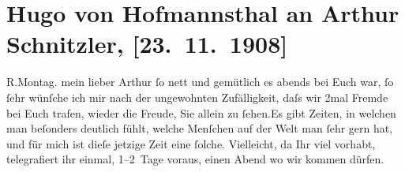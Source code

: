 

         
         \renewcommand{\erwaehntePersonen}{Personen: Hugo von Hofmannsthal, Gustav Seidler, Alfred von Winterstein}
         \renewcommand{\erwaehnteOrte}{Orte: Rodaun, Wien}
         \renewcommand{\erwaehnteWerke}{Werke: Der Weg ins Freie. Roman, [Gedichte]}
               \section[Hugo von Hofmannsthal an Arthur Schnitzler, {[}23. 11. 1908{]}]{ Hugo von Hofmannsthal an Arthur Schnitzler, {[}23. 11. 1908{]}}\nopagebreak{}\rehead{ }\begin{ledgroupsized}[t]{13cm}\normalsize\beginnumbering \toendnotes[C]{\smallbreak\pagebreak[2]} 
\toendnotes[C]{\smallbreak}\pstart
           \raggedleft{}{\pb}R.Montag.\pend
           \pstart{}mein lieber Arthur\pend\pstart
           ſo nett und gemütlich es \label{K_L01808-1v}\label{K_L01808-1h} abends bei Euch war, ſo ſehr wünſche ich mir nach der ungewohnten
               Zufälligkeit, daſs wir \introOben{}2mal\introOben{} Fremde bei Euch trafen, wieder
               die Freude, Sie allein zu ſehen.\hspace*{1.5em}Es gibt Zeiten, in
               welchen man beſonders deutlich fühlt, welche Menſchen {\pb}auf der Welt man ſehr gern hat,
               und für mich ist dieſe jetzige Zeit eine ſolche.\pend
           \pstart
           Vielleicht, da Ihr viel vorhabt, telegrafiert ihr einmal, 1–2 Tage voraus, einen
               Abend wo wir kommen dürfen.\pend
           \pstart

\end{ledgroupsized}
